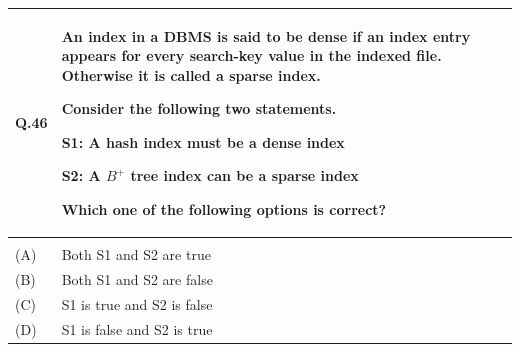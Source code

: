 \documentclass[14pt]{article}
\renewcommand{\arraystretch}{1.25}
\begin{document}
\renewcommand{\arraystretch}{1}

\vspace{0.3cm}

\renewcommand{\arraystretch}{1.25}

\begin{tabular}{|p{1.5cm}|p{12cm}|}
\hline

Q.46 &
\parbox[t]{\linewidth}{
\strut
An index in a DBMS is said to be dense if an index entry appears
for every search-key value in the indexed file. Otherwise it is called
a sparse index.

Consider the following two statements.

\vspace{0.2cm}

S1: A hash index must be a dense index

S2: A $B^+$ tree index can be a sparse index

\vspace{0.2cm}

Which one of the following options is correct?

\vspace{0.35cm}
}
\\
\hline

& \\[-0.2cm]
\hline

(A) & Both S1 and S2 are true \\[0.25cm]
\hline

(B) & Both S1 and S2 are false \\[0.25cm]
\hline

(C) & S1 is true and S2 is false \\[0.25cm]
\hline

(D) & S1 is false and S2 is true \\[0.25cm]
\hline

\end{tabular}

\renewcommand{\arraystretch}{1}

\vspace{0.3cm}
\end{document}
